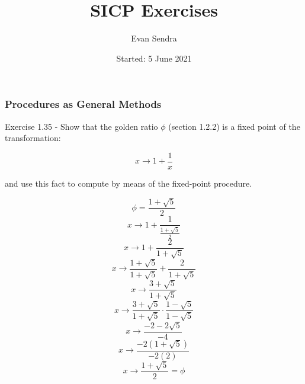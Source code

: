 \documentclass{article}
\title{SICP Exercises}
\author{Evan Sendra}
\date{Started: 5 June 2021}
\begin{document}
\maketitle
\newpage


\section{}
\subsection{}
\subsection{}
\subsection{}
  \subsubsection{}
  \subsubsection{}
  \subsubsection{Procedures as General Methods}
  Exercise 1.35 - Show that the golden ratio $\phi$ (section 1.2.2) is a fixed point of the transformation:
  
  \[x \rightarrow 1 + \frac{1}{x}\]
  
  and use this fact to compute  by means of the fixed-point procedure.

	\newcommand{\pe}{\frac{1 + \sqrt{5}}{2}}

	\[\phi = \pe\]
  \[x \rightarrow 1 + \frac{1}{\pe}\]
  \[x \rightarrow 1 + \frac{2}{1+\sqrt{5}}\]
  \[x \rightarrow \frac{1+\sqrt{5}}{1+\sqrt{5}} + \frac{2}{1+\sqrt{5}}\]
  \[x \rightarrow \frac{3+\sqrt{5}}{1+\sqrt{5}}\]
  \[x \rightarrow \frac{3+\sqrt{5}}{1+\sqrt{5}} \cdot \frac{1-\sqrt{5}}{1-\sqrt{5}}\]
  \[x \rightarrow \frac{-2-2\sqrt{5}}{-4}\]
  \[x \rightarrow \frac{-2(1+\sqrt{5})}{-2(2)}\]
  \[x \rightarrow \pe = \phi\]
\end{document}
